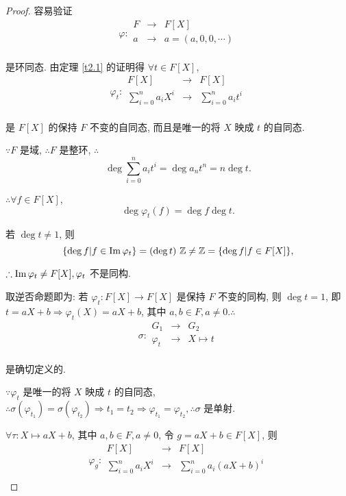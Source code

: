 \documentclass[color=black,device=normal,lang=cn,mode=geye]{elegantnote}
\begin{document}
\begin{proof}
    容易验证
    \[\varphi:\begin{array}{rcl}
        F & \to & F[X] \\
        a & \to & a=(a,0,0,\cdots) \\
    \end{array}\]

    是环同态. 由定理 \ref{t2.1} 的证明得 $\forall t\in F[X]$,
    \[\varphi_t:\begin{array}{rcl}
        F[X] & \to & F[X] \\
        \sum\limits_{i=0}^{n}a_iX^i & \to & \sum\limits_{i=0}^{n}a_it^i \\
    \end{array}\]

    是 $F[X]$ 的保持 $F$ 不变的自同态, 而且是唯一的将 $X$ 映成 $t$ 的自同态.

    $\because F$ 是域, $\therefore F$ 是整环, $\therefore$
    \[\deg\sum\limits_{i=0}^{n}a_it^i=\deg a_nt^n=n\deg t.\]

    $\therefore\forall f\in F[X]$,
    \[\deg\varphi_t(f)=\deg f\deg t.\]

    若 $\deg t\neq1$, 则
    \[\{\deg f|f\in\im \varphi_t\}=(\deg t)\ \mathbb{Z}\neq\mathbb{Z}=\{\deg f|f\in F[X]\},\]

    $\therefore\operatorname{Im} \varphi_t\neq F[X],\varphi_t$ 不是同构.

    取逆否命题即为: 若 $\varphi_t:F[X]\to F[X]$ 是保持 $F$ 不变的同构, 则 $\deg t=1$, 即 $t=aX+b\Rightarrow\varphi_t(X)=aX+b$, 其中 $a,b\in F,a\neq0.\therefore$
    \[\sigma:\begin{array}{rcl}
        G_1 & \to & G_2 \\
        \varphi_t & \to & X\mapsto t \\
    \end{array}\]

    是确切定义的.

    $\because\varphi_t$ 是唯一的将 $X$ 映成 $t$ 的自同态, $\therefore\sigma(\varphi_{t_1})=\sigma(\varphi_{t_2})\Rightarrow t_1=t_2\Rightarrow\varphi_{t_1}=\varphi_{t_2},\therefore\sigma$ 是单射.

    $\forall\tau:X\mapsto aX+b$, 其中 $a,b\in F,a\neq0$, 令 $g=aX+b\in F[X]$, 则
    \[\varphi_g:\begin{array}{rcl}
        F[X] & \to & F[X] \\
        \sum\limits_{i=0}^{n}a_iX^i & \to & \sum\limits_{i=0}^{n}a_i(aX+b)^i \\
    \end{array}\]


\end{proof}
\end{document}
